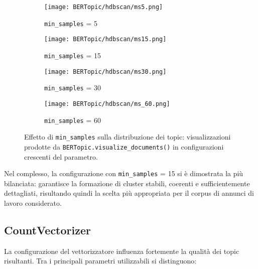\begin{figure}[H]
\centering
\begin{subfigure}{0.24\textwidth}
    \centering
    \texttt{[image: BERTopic/hdbscan/ms5.png]}
    \caption{\texttt{min\_samples} = 5}
\end{subfigure}\hfill
\begin{subfigure}{0.24\textwidth}
    \centering
    \texttt{[image: BERTopic/hdbscan/ms15.png]}
    \caption{\texttt{min\_samples} = 15}
\end{subfigure}\hfill
\begin{subfigure}{0.24\textwidth}
    \centering
    \texttt{[image: BERTopic/hdbscan/ms30.png]}
    \caption{\texttt{min\_samples} = 30}
\end{subfigure}\hfill
\begin{subfigure}{0.24\textwidth}
    \centering
    \texttt{[image: BERTopic/hdbscan/ms\_60.png]}
    \caption{\texttt{min\_samples} = 60}
\end{subfigure}
\caption{Effetto di \texttt{min\_samples} sulla distribuzione dei topic: visualizzazioni prodotte da \texttt{BERTopic.visualize\_documents()} in configurazioni crescenti del parametro.}
\label{fig:min-samples-umap}
\end{figure}

Nel complesso, la configurazione con \texttt{min\_samples} = 15 si è dimostrata la più bilanciata: 
garantisce la formazione di cluster stabili, coerenti e sufficientemente dettagliati, risultando quindi la scelta più appropriata per il corpus di annunci di lavoro considerato.

\subsection{CountVectorizer}

\noindent La configurazione del vettorizzatore influenza fortemente la qualità dei topic risultanti. 
Tra i principali parametri utilizzabili si distinguono:

